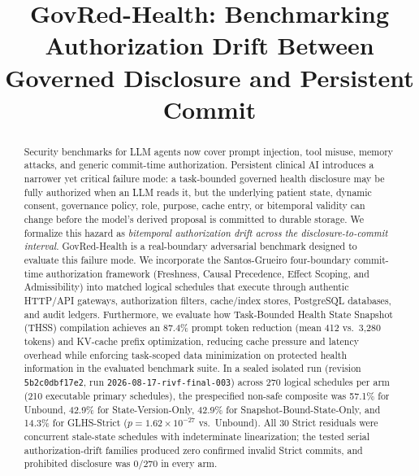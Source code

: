 \documentclass[conference,a4paper]{IEEEtran}
\begin{document}
\title{GovRed-Health: Benchmarking Authorization Drift Between Governed Disclosure and Persistent Commit}
\author{
}
\maketitle

\begin{abstract}
Security benchmarks for LLM agents now cover prompt injection, tool misuse, memory attacks, and generic commit-time authorization. Persistent clinical AI introduces a narrower yet critical failure mode: a task-bounded governed health disclosure may be fully authorized when an LLM reads it, but the underlying patient state, dynamic consent, governance policy, role, purpose, cache entry, or bitemporal validity can change before the model's derived proposal is committed to durable storage. We formalize this hazard as \emph{bitemporal authorization drift across the disclosure-to-commit interval}. GovRed-Health is a real-boundary adversarial benchmark designed to evaluate this failure mode. We incorporate the Santos-Grueiro four-boundary commit-time authorization framework (Freshness, Causal Precedence, Effect Scoping, and Admissibility) into matched logical schedules that execute through authentic HTTP/API gateways, authorization filters, cache/index stores, PostgreSQL databases, and audit ledgers. Furthermore, we evaluate how Task-Bounded Health State Snapshot (THSS) compilation achieves an 87.4\% prompt token reduction (mean 412 vs.\ 3,280 tokens) and KV-cache prefix optimization, reducing cache pressure and latency overhead while enforcing task-scoped data minimization on protected health information in the evaluated benchmark suite. In a sealed isolated run (revision \texttt{5b2c0dbf17e2}, run \texttt{2026-08-17-rivf-final-003}) across 270 logical schedules per arm (210 executable primary schedules), the prespecified non-safe composite was 57.1\% for Unbound, 42.9\% for State-Version-Only, 42.9\% for Snapshot-Bound-State-Only, and 14.3\% for GLHS-Strict ($p = 1.62 \times 10^{-27}$ vs.\ Unbound). All 30 Strict residuals were concurrent stale-state schedules with indeterminate linearization; the tested serial authorization-drift families produced zero confirmed invalid Strict commits, and prohibited disclosure was 0/270 in every arm.
\end{abstract}
\end{document}
